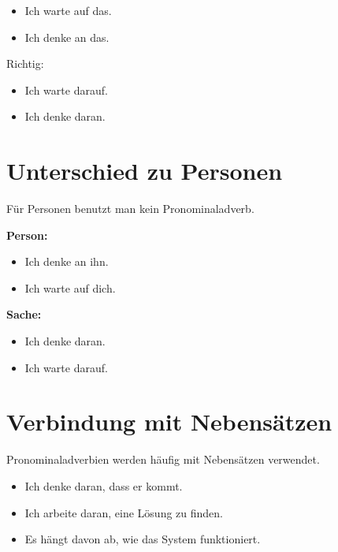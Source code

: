 \documentclass[a4paper]{article}
\begin{document}
        \begin{itemize}
            \item Ich warte auf das.
            \item Ich denke an das.
        \end{itemize}
        
        Richtig:
        
        \begin{itemize}
            \item Ich warte darauf.
            \item Ich denke daran.
        \end{itemize}
    
    
    \section{Unterschied zu Personen}
        
        Für Personen benutzt man kein Pronominaladverb.
        
        \textbf{Person:}
        
        \begin{itemize}
            \item Ich denke an ihn.
            \item Ich warte auf dich.
        \end{itemize}
        
        \textbf{Sache:}
        
        \begin{itemize}
            \item Ich denke daran.
            \item Ich warte darauf.
        \end{itemize}
    
    
    \section{Verbindung mit Nebensätzen}
        
        Pronominaladverbien werden häufig mit Nebensätzen verwendet.
        
        \begin{itemize}
            \item Ich denke daran, dass er kommt.
            \item Ich arbeite daran, eine Lösung zu finden.
            \item Es hängt davon ab, wie das System funktioniert.
        \end{itemize}
        
\end{document}
